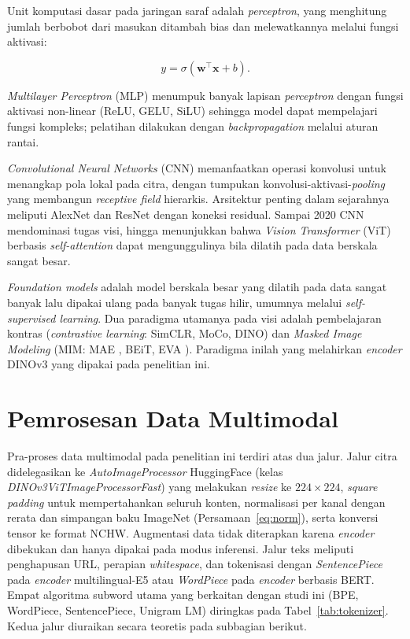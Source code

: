 Unit komputasi dasar pada jaringan saraf adalah \textit{perceptron}, yang menghitung jumlah berbobot dari masukan ditambah bias dan melewatkannya melalui fungsi aktivasi:

\begin{equation}
    y = \sigma(\mathbf{w}^\top \mathbf{x} + b).
    \label{eq:perceptron}
\end{equation}

\textit{Multilayer Perceptron} (MLP) menumpuk banyak lapisan \textit{perceptron} dengan fungsi aktivasi non-linear (ReLU, GELU, SiLU) sehingga model dapat mempelajari fungsi kompleks; pelatihan dilakukan dengan \textit{backpropagation} melalui aturan rantai.

\textit{Convolutional Neural Networks} (CNN) memanfaatkan operasi konvolusi untuk menangkap pola lokal pada citra, dengan tumpukan konvolusi-aktivasi-\textit{pooling} yang membangun \textit{receptive field} hierarkis. Arsitektur penting dalam sejarahnya meliputi AlexNet \citep{krizhevskyImageNet2012} dan ResNet \citep{heResNet2016} dengan koneksi residual. Sampai 2020 CNN mendominasi tugas visi, hingga \citet{dosovitskiyImageWorth16x162021} menunjukkan bahwa \textit{Vision Transformer} (ViT) berbasis \textit{self-attention} dapat mengunggulinya bila dilatih pada data berskala sangat besar.

\textit{Foundation models} adalah model berskala besar yang dilatih pada data sangat banyak lalu dipakai ulang pada banyak tugas hilir, umumnya melalui \textit{self-supervised learning}. Dua paradigma utamanya pada visi adalah pembelajaran kontras (\textit{contrastive learning}: SimCLR, MoCo, DINO) dan \textit{Masked Image Modeling} (MIM: MAE \citep{heMAE2022}, BEiT, EVA \citep{fangEVA022023}). Paradigma inilah yang melahirkan \textit{encoder} DINOv3 yang dipakai pada penelitian ini.

\section{Pemrosesan Data Multimodal}
\label{sec:imgproc}

Pra-proses data multimodal pada penelitian ini terdiri atas dua jalur. Jalur citra didelegasikan ke \textit{AutoImageProcessor} HuggingFace (kelas \textit{DINOv3ViTImageProcessorFast}) yang melakukan \textit{resize} ke $224 \times 224$, \textit{square padding} untuk mempertahankan seluruh konten, normalisasi per kanal dengan rerata dan simpangan baku ImageNet (Persamaan~\ref{eq:norm}), serta konversi tensor ke format NCHW. Augmentasi data tidak diterapkan karena \textit{encoder} dibekukan dan hanya dipakai pada modus inferensi. Jalur teks meliputi penghapusan URL, perapian \textit{whitespace}, dan tokenisasi dengan \textit{SentencePiece} pada \textit{encoder} multilingual-E5 atau \textit{WordPiece} pada \textit{encoder} berbasis BERT. Empat algoritma subword utama yang berkaitan dengan studi ini (BPE, WordPiece, SentencePiece, Unigram LM) diringkas pada Tabel~\ref{tab:tokenizer}. Kedua jalur diuraikan secara teoretis pada subbagian berikut.

